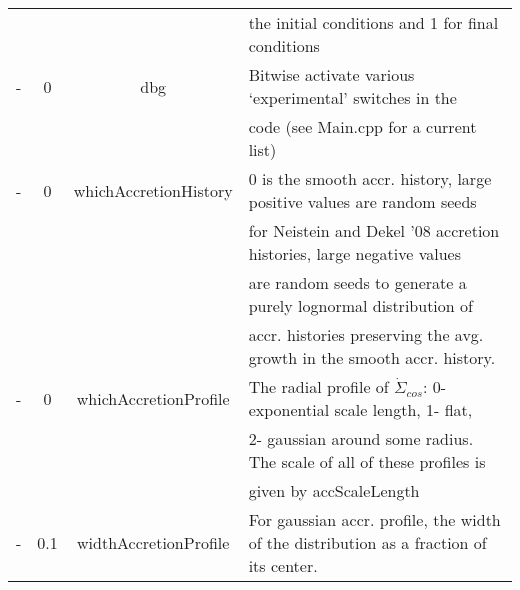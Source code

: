 \documentclass[11pt]{amsart}
\begin{document}
\begin{table}
{\begin{tabular}{cccl}
        & & & the initial conditions and 1 for final conditions \\
        - & 0 & dbg & Bitwise activate various `experimental' switches in the \\
        & & &  code (see Main.cpp for a current list) \\
        - & 0 & whichAccretionHistory & 0 is the smooth accr. history, large positive values are random seeds \\
        & & & for Neistein and Dekel '08 accretion histories,  large negative values\\
        & & &  are random seeds to generate a purely lognormal distribution of \\
        & & &  accr. histories preserving the avg. growth in the smooth accr. history. \\
        - & 0 & whichAccretionProfile & The radial profile of $\dot{\Sigma}_{cos}$: 0- exponential scale length, 1- flat, \\
        & & & 2- gaussian around some radius. The scale of all of these profiles is \\
        & & & given by accScaleLength  \\
        - & 0.1 & widthAccretionProfile & For gaussian accr. profile, the width of the distribution as a fraction of its center. 
        \end{tabular}
        }
\end{table} 
\end{document}
